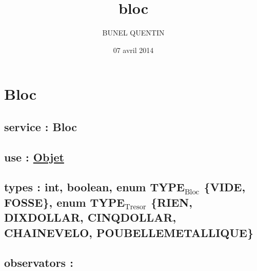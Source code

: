 \documentclass[11pt]{article}
\title{bloc}
\author{BUNEL QUENTIN}
\date{07 avril 2014}
\begin{document}
\maketitle

\setcounter{tocdepth}{3}
\tableofcontents
\vspace*{1cm}
\section{Bloc}
\label{sec-1}

\subsection{service : Bloc}
\label{sec-1.1}

\subsection{use : \href{file:///users/Etu5/3000675/Desktop/spec/objet.org}{Objet}}
\label{sec-1.2}

\subsection{types : int, boolean, enum TYPE$_{\mathrm{Bloc}}$ \{VIDE, FOSSE\}, enum TYPE$_{\mathrm{Tresor}}$ \{RIEN, DIXDOLLAR, CINQDOLLAR, CHAINEVELO, POUBELLEMETALLIQUE\}}
\label{sec-1.3}


\subsection{observators :}
\label{sec-1.4}

\subsubsection{}
\end{document}

